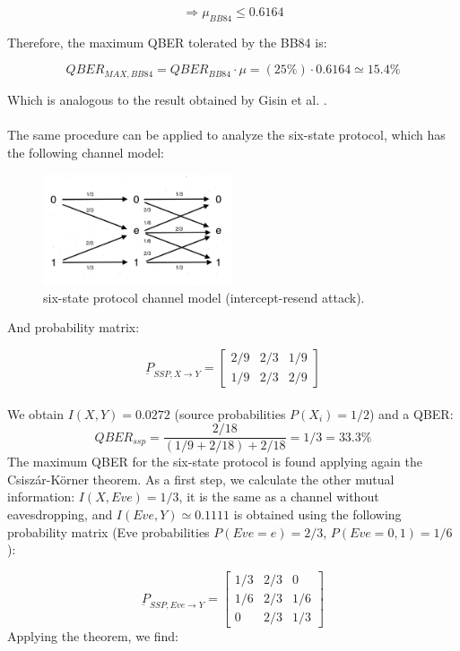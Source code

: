 \documentclass[journal, letterpaper]{IEEEtran}
\begin{document}
\[\Rightarrow \mu_{BB84} \leq 0.6164\]

Therefore, the maximum QBER tolerated by the BB84 is: 

\[QBER_{MAX,BB84} = QBER_{BB84}\cdot \mu = (25\%)\cdot0.6164 \simeq 15.4\% \]

Which is analogous to the result obtained by Gisin et al. \cite{cryptoreview}.
\\
\\
The same procedure can be applied to analyze the six-state protocol, which has the following channel model:

\begin{figure}[!h]
    \centering
    \includegraphics[width=0.5\textwidth]{Images/ssp_eve.jpg}
        \caption{six-state protocol channel model (intercept-resend attack).}
     \label{fig:quadtree}
\end{figure}

And probability matrix: 

\[\underbar{P}_{SSP,X\rightarrow Y} = \begin{bmatrix}
    2/9 & 2/3 & 1/9\\
    1/9 & 2/3 &  2/9
\end{bmatrix}\] 
\\
We obtain $I(X,Y) = 0.0272$ (source probabilities $P(X_i) = 1/2$) and a QBER: 
\[QBER_{ssp} = \frac{2/18}{(1/9 + 2/18) + 2/18} = 1/3 = 33.3\% \]
The maximum QBER for the six-state protocol is found applying again the Csiszár-Körner theorem. As a first step, we calculate the other mutual information: $I(X,Eve) = 1/3$, it is the same as a channel without eavesdropping, and $I(Eve,Y) \simeq 0.1111 $ is obtained using the following probability matrix (Eve probabilities $P(Eve = e) = 2/3$, $P(Eve = 0,1)=1/6$):

\[\underbar{P}_{SSP,Eve\rightarrow Y} = \begin{bmatrix}
    1/3 & 2/3 & 0\\
    1/6 & 2/3 &  1/6\\
    0 & 2/3 & 1/3
\end{bmatrix}\] 
Applying the theorem, we find:
\end{document}
